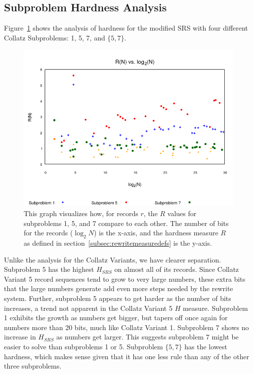 \subsection{Subproblem Hardness Analysis} \label{subsec:rewritehardness}
Figure~\ref{fig:rvslog} shows the analysis of hardness for the modified SRS with four different Collatz Subproblems: 1, 5, 7, and $\{5,7\}$. 
\begin{figure}
    \centering
    \includegraphics[scale=0.75]{ModAvoidanceAnalysisPics/R_vs_log.png}
    \caption{This graph visualizes how, for records $r$, the $R$ values for subproblems 1, 5, and 7 compare to each other. The number of bits for the records ($\log_2{N}$) is the x-axis, and the hardness measure $R$ as defined in section~\ref{subsec:rewritemeasuredefs} is the y-axis.}
    \label{fig:rvslog}
\end{figure}
Unlike the analysis for the Collatz Variants, we have clearer separation. Subproblem 5 has the highest $H_{SRS}$ on almost all of its records. Since Collatz Variant 5 record sequences tend to grow to very large numbers, these extra bits that the large numbers generate add even more steps needed by the rewrite system. Further, subproblem 5 appears to get harder as the number of bits increases, a trend not apparent in the Collatz Variant 5 $H$ measure. Subproblem 1 exhibits the growth as numbers get bigger, but tapers off once again for numbers more than 20 bits, much like Collatz Variant 1. Subproblem 7 shows no increase in $H_{SRS}$ as numbers get larger. This suggests subproblem 7 might be easier to solve than subproblems 1 or 5. Subproblem $\{5,7\}$ has the lowest hardness, which makes sense given that it has one less rule than any of the other three subproblems.
